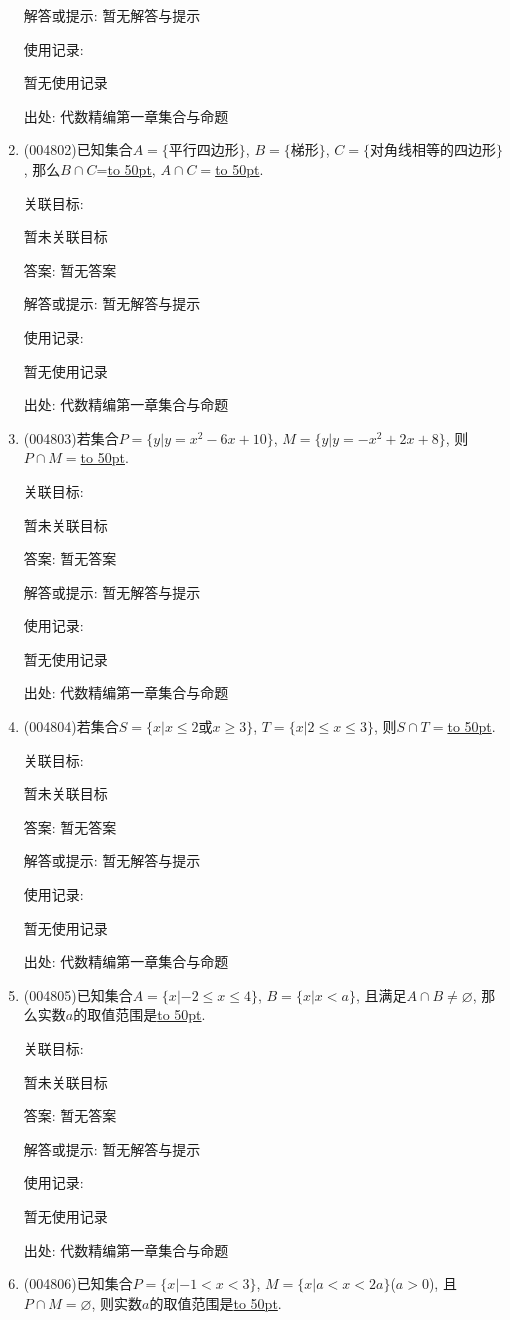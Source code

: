 \documentclass[10pt,a4paper]{article}
\newcommand{\blank}[1]{\underline{\hbox to #1pt{}}}
\begin{document}
\begin{enumerate}[1.]
解答或提示: 暂无解答与提示

使用记录:

暂无使用记录


出处: 代数精编第一章集合与命题
\item { (004802)}已知集合$A=\{\text{平行四边形}\}$, $B=\{\text{梯形}\}$, $C=\{\text{对角线相等的四边形}\}$, 那么$B\cap C$=\blank{50}, $A\cap C=$\blank{50}.


关联目标:

暂未关联目标

答案: 暂无答案

解答或提示: 暂无解答与提示

使用记录:

暂无使用记录


出处: 代数精编第一章集合与命题
\item { (004803)}若集合$P=\{y|y=x^2-6x+10\}$, $M=\{y|y=-x^2+2x+8\}$, 则$P\cap M=$\blank{50}.


关联目标:

暂未关联目标

答案: 暂无答案

解答或提示: 暂无解答与提示

使用记录:

暂无使用记录


出处: 代数精编第一章集合与命题
\item { (004804)}若集合$S=\{x|x\le 2\text{或}x\ge 3\}$, $T=\{x|2\le x\le 3\}$, 则$S\cap T=$\blank{50}.


关联目标:

暂未关联目标

答案: 暂无答案

解答或提示: 暂无解答与提示

使用记录:

暂无使用记录


出处: 代数精编第一章集合与命题
\item { (004805)}已知集合$A=\{x|-2\le x\le 4\}$, $B=\{x|x<a\}$, 且满足$A\cap B\ne \varnothing$, 那么实数$a$的取值范围是\blank{50}.


关联目标:

暂未关联目标

答案: 暂无答案

解答或提示: 暂无解答与提示

使用记录:

暂无使用记录


出处: 代数精编第一章集合与命题
\item { (004806)}已知集合$P=\{x|-1<x<3\}$, $M=\{x|a<x<2a\}$($a>0$), 且$P\cap M=\varnothing$, 则实数$a$的取值范围是\blank{50}.



\end{enumerate}
\end{document}
